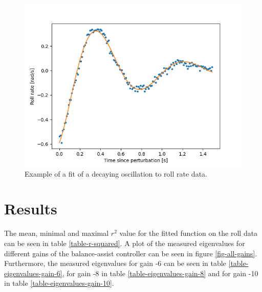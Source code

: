 \documentclass[12pt]{article}
\begin{document}
\begin{figure}[h]
    \centering
    \includegraphics[width=\columnwidth]{figures/example_roll_rate_fit.png}
    \caption{Example of a fit of a decaying oscillation to roll rate data.} \label{example-roll-rate-fit}
\end{figure}

\section{Results}
The mean, minimal and maximal $r^2$ value for the fitted function on the roll data can be seen in
table \ref{table-r-squared}. A plot of the measured eigenvalues for different gains of the
balance-assist controller can be seen in figure \ref{fig-all-gains}. Furthermore, the measured
eigenvalues for gain -6 can be seen in table \ref{table-eigenvalues-gain-6}, for gain -8 in table
\ref{table-eigenvalues-gain-8} and for gain -10 in table \ref{table-eigenvalues-gain-10}.
\end{document}
